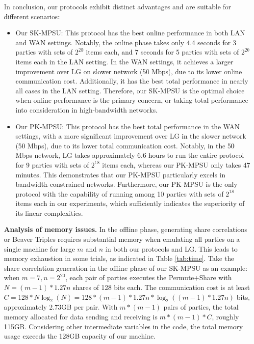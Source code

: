 \begin{trivlist}
In conclusion, our protocols exhibit distinct advantages and are suitable for different scenarios:
\begin{itemize}
  \item Our SK-MPSU: This protocol has the best online performance in both LAN and WAN settings. Notably, the online phase takes only $4.4$ seconds for 3 parties with sets of $2^{20}$ items each, and $7$ seconds for 5 parties with sets of $2^{20}$ items each in the LAN setting. In the WAN settings, it achieves a larger improvement over LG on slower network (50 Mbps), due to its lower online communication cost. Additionally, it has the best total performance in nearly all cases in the LAN setting. Therefore, our SK-MPSU is the optimal choice when online performance is the primary concern, or taking total performance into consideration in high-bandwidth networks.
  \item Our PK-MPSU: This protocol has the best total performance in the WAN settings, with a more significant improvement over LG in the slower network (50 Mbps), due to its lower total communication cost. Notably, in the 50 Mbps network, LG takes approximately 6.6 hours to run the entire protocol for 9 parties with sets of $2^{18}$ items each, whereas our PK-MPSU only takes 47 minutes. This demonstrates that our PK-MPSU particularly excels in bandwidth-constrained networks. Furthermore, our PK-MPSU is the only protocol with the capability of running among 10 parties with sets of $2^{18}$ items each in our experiments, which sufficiently indicates the superiority of its linear complexities.
\end{itemize}

\item \textbf{Analysis of memory issues.} In the offline phase, generating share correlations or Beaver Triples requires substantial memory when emulating all parties on a single machine for large $m$ and $n$ in both our protocols and LG. This leads to memory exhaustion in some trials, as indicated in Table \ref{tab:time}. Take the share correlation generation in the offline phase of our SK-MPSU as an example: when $m=7,n=2^{20}$, each pair of parties executes the Permute+Share with $N=(m-1)*1.27n$ shares of 128 bits each. The communication cost is at least $C=128*N\log_2(N)=128*(m-1)*1.27n*\log_2((m-1)*1.27n)$ bits, approximately 2.73GB per pair. With $m*(m-1)$ pairs of parties, the total memory allocated for data sending and receiving is $m*(m-1)*C$, roughly 115GB. Considering other intermediate variables in the code, the total memory usage exceeds the 128GB capacity of our machine. 
\end{trivlist}

